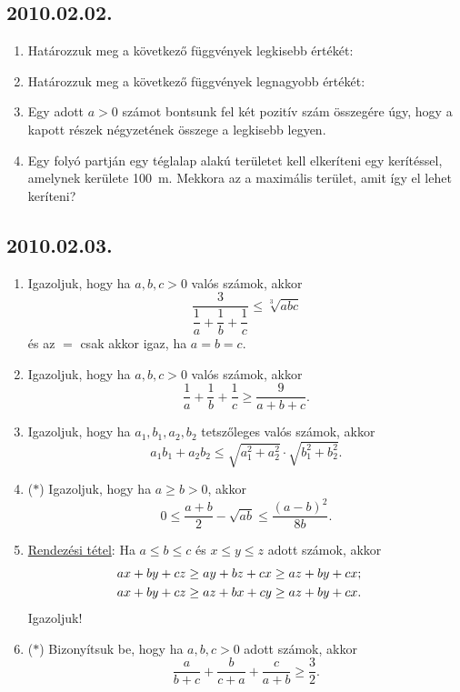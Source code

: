 \subsection*{2010.02.02.}
\begin{enumerate}
\item Határozzuk meg a következő függvények legkisebb értékét:
\item Határozzuk meg a következő függvények legnagyobb értékét:

\item Egy adott $a>0$ számot bontsunk fel két pozitív szám összegére úgy,
hogy a kapott részek négyzetének összege a legkisebb legyen.
\item Egy folyó partján egy téglalap alakú területet kell elkeríteni
egy kerítéssel, amelynek kerülete 100~m. Mekkora az a maximális terület, amit így el lehet keríteni?
\end{enumerate}

\subsection*{2010.02.03.}
\begin{enumerate}
\item Igazoljuk, hogy ha $a,b,c>0$ valós számok, akkor
$$\dfrac{3}{\dfrac{1}{a}+\dfrac{1}{b}+\dfrac{1}{c}}\le \sqrt[3]{abc}$$
és az $=$ csak akkor igaz, ha $a=b=c$.
\item Igazoljuk, hogy ha $a,b,c>0$ valós számok, akkor
$$\dfrac{1}{a}+\dfrac{1}{b}+\dfrac{1}{c}\ge \dfrac{9}{a+b+c}.$$
\item Igazoljuk, hogy ha $a_1, b_1,a_2,b_2$ tetszőleges valós számok, akkor
$$a_1b_1+a_2b_2\le \sqrt{a_1^2+a_2^2}\cdot \sqrt{b_1^2+b_2^2}.$$
\item ($*$) Igazoljuk, hogy ha $a\ge b> 0$, akkor 
$$0\le \dfrac{a+b}{2}-\sqrt{ab}\le \dfrac{(a-b)^2}{8b}.$$
\item \underline{Rendezési tétel}: Ha $a\le b \le c$ és $x\le y \le z$ adott számok, akkor 
\begin{align*}
ax+by+cz&\ge ay+bz+cx\ge az+by+cx;\cr
ax+by+cz&\ge az+bx+cy\ge az+by+cx.
\end{align*}
Igazoljuk!
\item ($*$) Bizonyítsuk be, hogy ha $a,b,c>0$ adott számok, akkor
$$\dfrac{a}{b+c}+\dfrac{b}{c+a}+\dfrac{c}{a+b}\ge \dfrac{3}{2}.$$
\end{enumerate}

